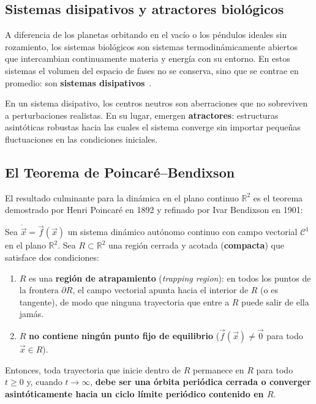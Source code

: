 \subsection{Sistemas disipativos y atractores biológicos}

A diferencia de los planetas orbitando en el vacío o los péndulos ideales sin rozamiento, los sistemas biológicos son sistemas termodinámicamente abiertos que intercambian continuamente materia y energía con su entorno. En estos sistemas el volumen del espacio de fases no se conserva, sino que se contrae en promedio: son \textbf{sistemas disipativos}~\cite{edelstein2007}.

En un sistema disipativo, los centros neutros son aberraciones que no sobreviven a perturbaciones realistas. En su lugar, emergen \textbf{atractores}: estructuras asintóticas robustas hacia las cuales el sistema converge sin importar pequeñas fluctuaciones en las condiciones iniciales.

\subsection{El Teorema de Poincaré--Bendixson}

El resultado culminante para la dinámica en el plano continuo $\mathbb{R}^2$ es el teorema demostrado por Henri Poincaré en 1892 y refinado por Ivar Bendixson en 1901:

\begin{theorem}
\label{thm:poincare_bendixson}
Sea $\dot{\vec{x}} = \vec{f}(\vec{x})$ un sistema dinámico autónomo continuo con campo vectorial $\mathcal{C}^1$ en el plano $\mathbb{R}^2$. Sea $R \subset \mathbb{R}^2$ una región cerrada y acotada (\textbf{compacta}) que satisface dos condiciones:
\begin{enumerate}
    \item $R$ es una \textbf{región de atrapamiento} (\emph{trapping region}): en todos los puntos de la frontera $\partial R$, el campo vectorial apunta hacia el interior de $R$ (o es tangente), de modo que ninguna trayectoria que entre a $R$ puede salir de ella jamás.
    \item $R$ \textbf{no contiene ningún punto fijo de equilibrio} ($\vec{f}(\vec{x}) \neq \vec{0}$ para todo $\vec{x} \in R$).
\end{enumerate}
Entonces, toda trayectoria que inicie dentro de $R$ permanece en $R$ para todo $t \ge 0$ y, cuando $t \to \infty$, \textbf{debe ser una órbita periódica cerrada o converger asintóticamente hacia un ciclo límite periódico contenido en $R$}.
\end{theorem}


